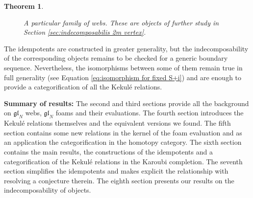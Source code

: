 \documentclass[12pt]{amsart}
\newtheorem*{thm}{Theorem}
\theoremstyle{definition}
\theoremstyle{remark}
\numberwithin{equation}{section}
\numberwithin{figure}{section}
\newcommand{\GL}{\mathfrak{gl}}
\begin{document}
\begin{thm}
\begin{figure}[htbp!]
    \caption{A particular family of webs. These are objects of further study in Section \ref{sec:indecomposabilis 2m vertex}.}
    \label{fig:Gammaim}
\end{figure}
\end{thm}

The idempotents are constructed in greater generality, but the indecomposability of the corresponding objects remains to be checked for a generic boundary sequence. Nevertheless, the isomorphisms between some of them remain true in full generality (see Equation \eqref{eq:isomorphism for fixed S+i}) and are enough to provide a categorification of all the Kekulé relations.

{\bf Summary of results:} The second and third sections provide all the background on $\GL_N$ webs, $\GL_N$ foams and their evaluations. The fourth section introduces the Kekulé relations themselves and  the equivalent versions we found. The fifth section contains some new relations in the kernel of the foam evaluation and as an application the categorification in the homotopy category. The sixth section contains the main  results, the constructions of the idempotents and a categorification of the Kekulé relations in the Karoubi completion. The seventh section simplifies the idempotents and makes explicit the relationship with \cite{grlj20266valentvertexmathfrakglnweb} resolving a conjecture therein. The eighth section presents our results on the indecomposability of objects.
\end{document}
